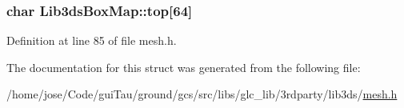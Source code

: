 \hypertarget{struct_lib3ds_box_map_a0f0280626fcd5c4f76260b84dea7ec6c}{
\subsubsection[{top}]{\setlength{\rightskip}{0pt plus 5cm}char Lib3ds\-Box\-Map\-::top\mbox{[}64\mbox{]}}}\label{struct_lib3ds_box_map_a0f0280626fcd5c4f76260b84dea7ec6c}


Definition at line 85 of file mesh.\-h.



The documentation for this struct was generated from the following file\-:\begin{DoxyCompactItemize}
\item 
/home/jose/\-Code/gui\-Tau/ground/gcs/src/libs/glc\-\_\-lib/3rdparty/lib3ds/\hyperlink{mesh_8h}{mesh.\-h}\end{DoxyCompactItemize}
